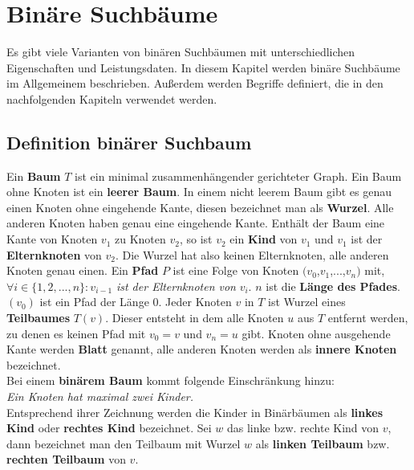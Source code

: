 \documentclass[a4paper,12pt]{article}
\begin{document}
\newpage
\section {Binäre Suchbäume}
Es gibt viele Varianten von binären Suchbäumen mit unterschiedlichen Eigenschaften und Leistungsdaten. In diesem Kapitel werden binäre Suchbäume im Allgemeinem beschrieben. Außerdem werden Begriffe definiert, die in den nachfolgenden Kapiteln verwendet werden. \\
\subsection{Definition binärer Suchbaum}
Ein \textbf{Baum} $T$ ist ein minimal zusammenhängender gerichteter Graph. Ein Baum ohne Knoten ist ein \textbf{leerer Baum}. In einem nicht leerem Baum gibt es genau einen Knoten ohne eingehende Kante, diesen bezeichnet man als \textbf{Wurzel}. Alle anderen Knoten haben genau eine eingehende Kante.  Enthält der Baum eine Kante von Knoten $v_1$ zu Knoten $v_2$, so ist $v_2$ ein \textbf{Kind} von $v_1$ und $v_1$ ist der  \textbf{Elternknoten} von $v_2$. Die Wurzel hat also keinen Elternknoten, alle anderen Knoten genau einen.  Ein \textbf{Pfad} $P$ ist eine Folge von Knoten $(v_0$,$v_1$,...,$v_n)$ mit, $\forall i \in \{ 1, 2,..., n \} \colon v_{i-1}$ \textit{ist der Elternknoten von} $v_i$. $n$ ist die \textbf{Länge des Pfades}. $\left(v_0\right)$ ist ein Pfad der Länge $0$. Jeder Knoten $v$ in $T$ ist Wurzel eines \textbf{Teilbaumes} $T(v)$. Dieser entsteht in dem alle Knoten $u$ aus $T$ entfernt werden, zu denen es keinen Pfad mit  $v_0 = v$ und $v_n = u$ gibt. Knoten ohne ausgehende Kante werden \textbf{Blatt} genannt, alle anderen Knoten werden als \textbf{innere Knoten} bezeichnet.\\
Bei einem \textbf{binärem Baum} kommt folgende Einschränkung hinzu:  \\
\textit{Ein Knoten hat maximal zwei Kinder.}\\ 
Entsprechend ihrer Zeichnung werden die Kinder in Binärbäumen als \textbf{linkes Kind} oder \textbf{rechtes Kind} bezeichnet. Sei $w$ das linke bzw. rechte Kind von $v$, dann bezeichnet man den Teilbaum mit Wurzel $w$ als \textbf{linken Teilbaum} bzw. \textbf{rechten Teilbaum}  von $v$.  
\end{document}
